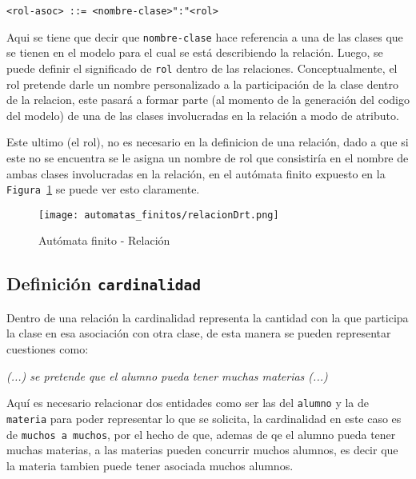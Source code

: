 \begin{lstlisting}[caption={BNF - Rol},basicstyle=\ttfamily\footnotesize]
  <rol-asoc> ::= <nombre-clase>":"<rol>
\end{lstlisting}

Aqui se tiene que decir que \texttt{nombre-clase} hace referencia a una de las
clases que se tienen en el modelo para el cual se está describiendo la
relación. Luego, se puede definir el significado de \texttt{rol} dentro de las
relaciones. Conceptualmente, el rol pretende darle un nombre personalizado a la
participación de la clase dentro de la relacion, este pasará a formar parte (al
momento de la generación del codigo del modelo) de una de las clases
involucradas en la relación a modo de atributo.

Este ultimo (el rol), no es necesario en la definicion de una relación, dado a
que si este no se encuentra se le asigna un nombre de rol que consistiría en el
nombre de ambas clases involucradas en la relación, en el autómata finito
expuesto en la \texttt{Figura \ref{fig:af_relacion}} se puede ver esto
claramente.

\begin{figure}[H]
	\centering
	\texttt{[image: automatas\_finitos/relacionDrt.png]}
	\caption{Autómata finito - Relación}
	\label{fig:af_relacion}
\end{figure}

\subsection*{Definición \texttt{cardinalidad}}
\label{sub:cardinalidad}

Dentro de una relación la cardinalidad representa la cantidad con la que
participa la clase en esa asociación con otra clase, de esta manera se pueden
representar cuestiones como:

\begin{displayquote}
	\textit{(...) se pretende que el alumno pueda tener muchas materias (...)}
\end{displayquote}

Aquí es necesario relacionar dos entidades como ser las del \texttt{alumno} y
la de \texttt{materia} para poder representar lo que se solicita, la
cardinalidad en este caso es de \texttt{muchos a muchos}, por el hecho de que,
ademas de qe el alumno pueda tener muchas materias, a las materias pueden
concurrir muchos alumnos, es decir que la materia tambien puede tener asociada
muchos alumnos.

